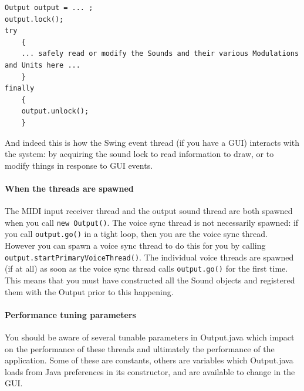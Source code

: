 \documentclass{article}
\begin{document}
\begin{verbatim}
Output output = ... ;
output.lock();
try
    {
    ... safely read or modify the Sounds and their various Modulations and Units here ...
    }
finally
    {
    output.unlock();
    }
\end{verbatim}

And indeed this is how the Swing event thread (if you have a GUI) interacts with the system: by acquiring the sound lock to read information to draw, or to modify things in response to GUI events.

\paragraph{When the threads are spawned}  The MIDI input receiver thread and the output sound thread are both spawned when you call {\tt new Output()}.  The voice sync thread is not necessarily spawned: if you call {\tt output.go()} in a tight loop, then you are the voice sync thread.  However you can spawn a voice sync thread to do this for you by calling {\tt output.startPrimaryVoiceThread()}.  The individual voice threads are spawned (if at all) as soon as the voice sync thread calls {\tt output.go()} for the first time.  This means that you must have constructed all the Sound objects and registered them with the Output prior to this happening.

\paragraph{Performance tuning parameters} You should be aware of several tunable parameters in Output.java which impact on the performance of these threads and ultimately the performance of the application.  Some of these are constants, others are variables which Output.java loads from Java preferences in its constructor, and are available to change in the GUI.
\end{document}
